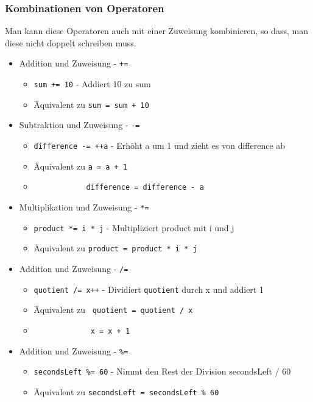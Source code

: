 \documentclass{article}
\begin{document}
	\subsubsection{Kombinationen von Operatoren}
	Man kann diese Operatoren auch mit einer Zuweisung kombinieren, so dass, man diese nicht doppelt schreiben muss.
	\begin{itemize}
		\item{Addition und Zuweisung - \verb|+=|}
		\begin{itemize}
			\item{\verb|sum += 10| - Addiert 10 zu sum}
			\item{Äquivalent zu \verb|sum = sum + 10|}
		\end{itemize}
		\item{Subtraktion und Zuweisung - \verb|-=|}
		\begin{itemize}
			\item{\verb|difference -= ++a| - Erhöht a um 1 und zieht es von difference ab}
			\item{Äquivalent zu \verb|a = a + 1|}
			\item[]{\verb|            difference = difference - a|}
		\end{itemize}
		\item{Multiplikation und Zuweisung - \verb|*=|}
		\begin{itemize}
			\item{\verb|product *= i * j| - Multipliziert product mit i und j}
			\item{Äquivalent zu \verb|product = product * i * j|}
		\end{itemize}
		\item{Addition und Zuweisung - \verb|/=|}
		\begin{itemize}
			\item{\verb|quotient /= x++| - Dividiert \verb|quotient| durch x und addiert 1}
			\item{Äquivalent zu \verb| quotient = quotient / x|}
			\item[]{\verb|             x = x + 1|}
		\end{itemize}
		\item{Addition und Zuweisung - \verb|%=|}
		\begin{itemize}
			\item{\verb|secondsLeft %= 60| - Nimmt den Rest der Division secondsLeft / 60}
			\item{Äquivalent zu \verb|secondsLeft = secondsLeft % 60|}
		\end{itemize}
	\end{itemize}
\end{document}
